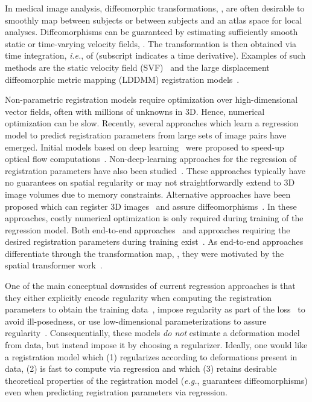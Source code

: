 \documentclass[10pt,twocolumn,letterpaper,table]{article}
\numberwithin{equation}{section}
\theoremstyle{plain}
\theoremstyle{definition}
\def\eg{\emph{e.g.}}  \def\Eg{\emph{E.g.}}
\def\ie{\emph{i.e.}}  \def\Ie{\emph{I.e.}}
\begin{document}
In medical image analysis, diffeomorphic transformations, , are often desirable to smoothly map between subjects or between subjects and an atlas space for local analyses. Diffeomorphisms can be guaranteed by estimating sufficiently smooth~\cite{dupuis1998} static or time-varying velocity fields, . The transformation is then obtained via time integration, \ie, of  (subscript  indicates a time derivative). Examples of such methods are the static velocity field (SVF)~\cite{vercauteren2009diffeomorphic} and the large displacement diffeomorphic metric mapping (LDDMM) registration models~\cite{beg2005,vialard2012diffeomorphic,hart2009optimal,avants2009advanced}. 

Non-parametric registration models require optimization over high-dimensional vector fields, often with millions of unknowns in 3D. Hence, numerical optimization can be slow. Recently, several approaches which learn a regression model to predict registration parameters from large sets of image pairs have emerged. Initial models based on deep learning~\cite{dosovitskiy2015flownet,ilg2017flownet} were proposed to speed-up optical flow computations~\cite{horn1981determining,beauchemin1995computation,brox2004high,borzi2003optimal,zach2007duality, sun2010secrets}. Non-deep-learning approaches for the regression of registration parameters have also been studied~\cite{wang2013joint,wang2015predict,chou20132d,cao2015semi,gutierrez2017guiding}. These approaches typically have no guarantees on spatial regularity or may not straightforwardly extend to 3D image volumes due to memory constraints. Alternative approaches have been proposed which can register 3D images~\cite{rohe2017svf,sokooti2017nonrigid,de2017end,hu2018label,balakrishnan2018unsupervised,fan2018adversarial} and assure diffeomorphisms~\cite{yang2016fast,yang2017quicksilver}. In these approaches, costly numerical optimization is only required during training of the regression model. Both end-to-end approaches~\cite{de2017end,hu2018label,balakrishnan2018unsupervised,fan2018adversarial} and approaches requiring the desired registration parameters during training exist~\cite{yang2016fast,yang2017quicksilver,rohe2017svf}. As end-to-end approaches differentiate through the transformation map, , they were motivated by the spatial transformer work~\cite{jaderberg2015spatial}.

One of the main conceptual downsides of current regression approaches is that they either explicitly encode regularity when computing the registration parameters to obtain the training data~\cite{yang2016fast,yang2017quicksilver,rohe2017svf}, impose regularity as part of the loss~\cite{hu2018label,balakrishnan2018unsupervised,fan2018adversarial} to avoid ill-posedness, or use low-dimensional parameterizations to assure regularity~\cite{sokooti2017nonrigid,de2017end}. Consequentially, these models \emph{do not} estimate a deformation model from data, but instead impose it by choosing a regularizer. Ideally, one would like a registration model which (1) regularizes according to deformations present in data, (2) is fast to compute via regression and which (3) retains desirable theoretical properties of the registration model (\eg, guarantees diffeomorphisms) even when predicting registration parameters via regression.
\end{document}
